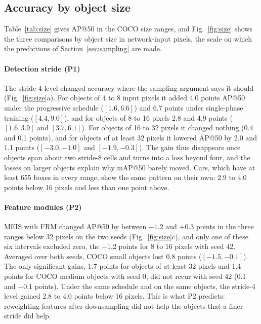 \documentclass[preprint,12pt]{elsarticle}
\begin{document}
\subsection{Accuracy by object size}
\label{sec:res-size}

Table~\ref{tab:size} gives AP@50 in the COCO size ranges, and
Fig.~\ref{fig:size} shows the three comparisons by object size in network-input
pixels, the scale on which the predictions of Section~\ref{sec:sampling} are made.

\paragraph{Detection stride (P1)}
The stride-4 level changed accuracy where the sampling argument says it should
(Fig.~\ref{fig:size}a). For objects of 4 to 8 input pixels it added 4.0 points
AP@50 under the progressive schedule ($[1.6, 6.6]$) and 6.7 points under
single-phase training ($[4.4, 9.0]$), and for objects of 8 to 16 pixels 2.8 and
4.9 points ($[1.6, 3.9]$ and $[3.7, 6.1]$). For objects of 16 to 32 pixels it
changed nothing (0.4 and 0.1 points), and for objects of at least 32 pixels it
lowered AP@50 by 2.0 and 1.1 points ($[-3.0, -1.0]$ and $[-1.9, -0.3]$). The gain
thus disappears once objects span about two stride-8 cells and turns into a loss
beyond four, and the losses on larger objects explain why mAP@50 barely moved. Cars, which have at least 655
boxes in every range, show the same pattern on their own: 2.9 to 4.0 points below
16 pixels and less than one point above.

\paragraph{Feature modules (P2)}
MEIS with FRM changed AP@50 by between $-1.2$ and $+0.3$ points in the three
ranges below 32 pixels on the two seeds (Fig.~\ref{fig:size}c), and only one of
these six intervals excluded zero, the $-1.2$ points for 8 to 16 pixels with seed
42. Averaged over both seeds, COCO small objects lost 0.8 points ($[-1.5, -0.1]$).
The only significant gains, 1.7 points for objects of at least 32 pixels and 1.4
points for COCO medium objects with seed 0, did not recur with seed 42 (0.1 and
$-0.1$ points). Under the same schedule and on the
same objects, the stride-4 level gained 2.8 to 4.0 points below 16 pixels. This is
what P2 predicts: reweighting features after downsampling did not help the objects
that a finer stride did help.
\end{document}
